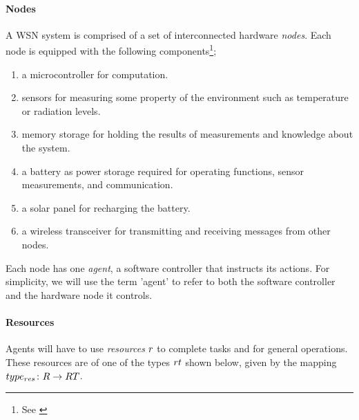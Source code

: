 
\label{problem_overview}

\paragraph{Nodes}
A WSN system is comprised of a set of interconnected hardware \textit{nodes}. Each node is equipped with the following components\footnote{See \cite{muhammad_r_ahmed_2012_1072589}};
\begin{enumerate}
	\item a microcontroller for computation.
	\item sensors for measuring some property of the environment such as temperature or radiation levels.
	\item memory storage for holding the results of measurements and knowledge about the system.
	\item a battery as power storage required for operating functions, sensor measurements, and communication.
	\item a solar panel for recharging the battery.
	\item  a wireless transceiver for  transmitting and receiving messages from other nodes.
\end{enumerate}

Each node has one \textit{agent}, a software controller that instructs its actions. For simplicity, we will use the term 'agent' to refer to both the software controller and the hardware node it controls.

\paragraph{Resources}
\label{section:overview:resources}
\newcommand{\varResourceType}[2]{\varSymbol{RT}{#1}{#2}}
\newcommand{\setResourceType}[2]{\setSymbol{RT}{#1}{#2}}
\newcommand{\formalResourceType}[2]{
	\functionFormal{type_{res}}
	{\setResource{}{}}
	{\setResourceType{}{}}
}
\newcommand{\functionResourceType}[2]{
	\functionSignature{type_{res}}
	{\setResource{}{}}}

Agents will have to use \textit{resources} $\varResource{}{}$ to complete tasks and for general operations. These resources are of one of the types $\varResourceType{}{}$ shown below, given by the mapping $\formalResourceType{}{}$.

